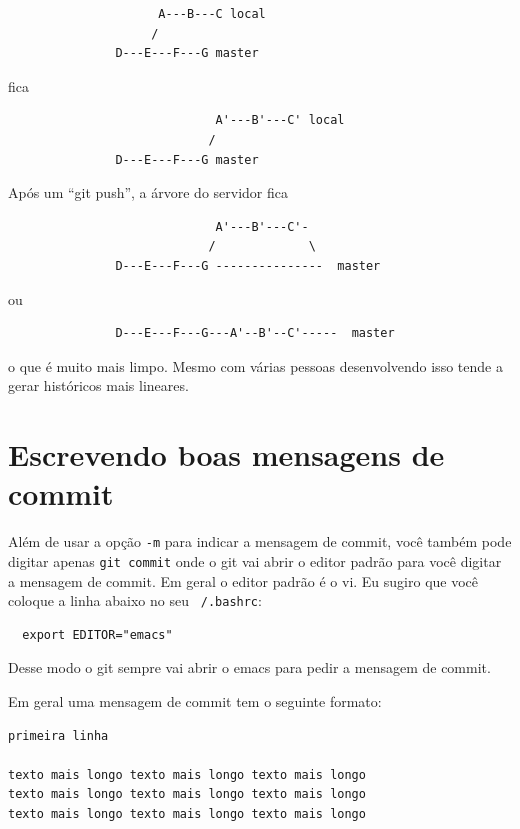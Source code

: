 \documentclass[12pt,brazil]{book}
\begin{document}
\begin{verbatim}
                     A---B---C local
                    /
               D---E---F---G master
\end{verbatim}

fica

\begin{verbatim}
                             A'---B'---C' local
                            /
               D---E---F---G master
\end{verbatim}

Após um ``git push'', a árvore do servidor fica

\begin{verbatim}
                             A'---B'---C'-
                            /             \
               D---E---F---G ---------------  master
\end{verbatim}

ou

\begin{verbatim}
               D---E---F---G---A'--B'--C'-----  master
\end{verbatim}

o que é muito mais limpo. Mesmo com várias pessoas desenvolvendo isso
tende a gerar históricos mais lineares.

\section{Escrevendo boas mensagens de commit}
\label{sec:escr-boas-mens}

Além de usar a opção \texttt{-m} para indicar a mensagem de commit,
você também pode digitar apenas \texttt{git commit} onde o git vai
abrir o editor padrão para você digitar a mensagem de commit. Em geral
o editor padrão é o vi. Eu sugiro que você coloque a linha abaixo no
seu \texttt{~/.bashrc}:

\begin{verbatim}
  export EDITOR="emacs"
\end{verbatim}

Desse modo o git sempre vai abrir o emacs para pedir a mensagem de
commit.

Em geral uma mensagem de commit tem o seguinte formato:

\begin{verbatim}
primeira linha

texto mais longo texto mais longo texto mais longo
texto mais longo texto mais longo texto mais longo
texto mais longo texto mais longo texto mais longo 
\end{verbatim}
\end{document}
